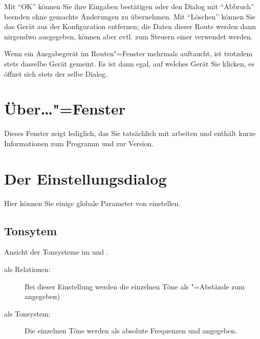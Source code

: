 Mit "`OK"' können Sie ihre Eingaben bestätigen oder den Dialog 
mit "`Abbruch"' beenden ohne gemachte Änderungen zu übernehmen. 
Mit "`Löschen"' können Sie das Gerät aus der Konfiguration 
entfernen; die Daten dieser Route werden dann nirgendwo ausgegeben, 
können aber evtl. zum Steuern einer  verwendet 
werden.

Wenn ein Ausgabegerät im Routen"=Fenster mehrmals auftaucht, 
ist trotzdem stets dasselbe Gerät gemeint. Es ist dann egal, 
auf welches Gerät Sie klicken, es öffnet sich stets der selbe 
Dialog.

\section{Über…"=Fenster}\label{sec:DE_ABOUT}

Dieses Fenster zeigt lediglich, das Sie tatsächlich mit \mutabor{} 
arbeiten und enthält kurze Informationen zum Programm und zur 
Version.

\section{Der Einstellungsdialog}\label{sec:DE_SETUP}
Hier können Sie einige globale Parameter von \mutabor{} einstellen.

\subsection{Tonsytem}
Ansicht der Tonsysteme im
 und
.
\begin{description}
\item[als Relationen:] Bei dieser Einstellung werden
  die einzelnen Töne als "=Abstände zum
   angegeben)
\item[als Tonsystem:] Die einzelnen Töne werden als
  absolute Frequenzen und 
  angegeben.
\end{description}

